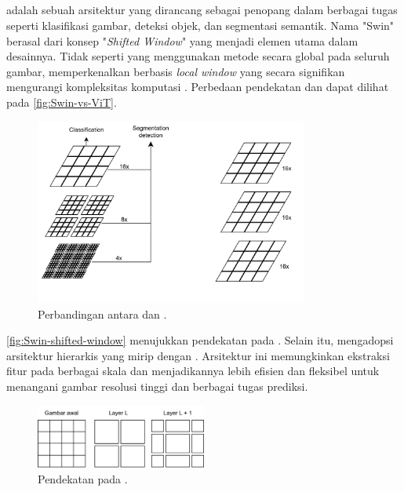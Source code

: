 \subsection{\swin}
\label{subsec:swin}

\swin{} adalah sebuah arsitektur \vitfull{} yang dirancang sebagai penopang dalam berbagai tugas \cv{} seperti klasifikasi gambar, deteksi objek, dan segmentasi semantik. Nama "Swin" berasal dari konsep
"\emph{Shifted Window}" yang menjadi elemen utama dalam desainnya. Tidak seperti \vit{} yang menggunakan metode \selfattention{} secara global
pada seluruh gambar, \swin{} memperkenalkan \selfattention{} berbasis \emph{local window} yang secara signifikan mengurangi kompleksitas komputasi \parencite{liu2021swin}. Perbedaan pendekatan \swin{} dan \vit{} dapat dilihat pada \autoref{fig:Swin-vs-ViT}. 

\begin{figure}[htbp]
    \centering
    \includegraphics[width=0.8\textwidth]{images/swin-vit.png}
    \caption{Perbandingan antara \swin{} dan \vitfull{} \parencite{liu2021swin}.}
    \label{fig:Swin-vs-ViT}
\end{figure}


\autoref{fig:Swin-shifted-window} menujukkan pendekatan \shiftedwindow{} pada \swin. Selain itu, \swin{} mengadopsi arsitektur hierarkis yang mirip dengan \cnn. Arsitektur ini memungkinkan ekstraksi fitur pada berbagai skala dan menjadikannya lebih efisien dan fleksibel untuk menangani gambar resolusi tinggi dan berbagai tugas prediksi.

\begin{figure}[htbp]
    \centering
    \includegraphics[width=0.5\textwidth]{images/swin-shifted-window.png}
    \caption{Pendekatan \shiftedwindow{} pada \swin{} \parencite{liu2021swin}.}
    \label{fig:Swin-shifted-window}
\end{figure}

